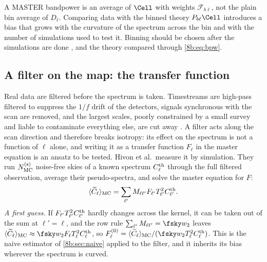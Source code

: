 \begin{pitfall}
A MASTER bandpower is an average of $\Cell$ with weights $\mathcal F_{b\ell}$, not the plain bin average of
$D_\ell$. Comparing data with the binned theory $P_{b\ell}\Cell$ introduces a bias that grows with the
curvature of the spectrum across the bin and with the number of simulations used to test it.
Binning should be chosen after the simulations are done , and the theory compared
through \eqref{8b:eq:bpw}.
\end{pitfall}

\subsection{A filter on the map: the transfer function}
\label{8b:sec:transfer}

Real data are filtered before the spectrum is taken. Timestreams are high-pass filtered to
suppress the $1/f$ drift of the detectors, signals synchronous with the scan are removed, and the
largest scales, poorly constrained by a small survey and liable to contaminate everything else, are
cut away . A filter acts along the scan direction and therefore breaks isotropy:
its effect on the spectrum is not a function of $\ell$ alone, and writing it as a transfer function
$F_\ell$ in the master equation is an ansatz to be tested. Hivon et al.\ measure it by simulation.
They run $N^{(\rm s)}_{\rm MC}$ noise-free skies of a known spectrum $C^{\rm th}_\ell$ through the full
filtered observation, average their pseudo-spectra, and solve the master equation for $F$:
\[
  \langle\widetilde C_\ell\rangle_{\rm MC}=\sum_{\ell'}M_{\ell\ell'}F_{\ell'}T^2_{\ell'}C^{\rm th}_{\ell'} .
\]
\emph{A first guess.} If $F_{\ell'}T^2_{\ell'}C^{\rm th}_{\ell'}$ hardly changes across the kernel, it can be taken out of
the sum at $\ell'=\ell$, and the row rule $\sum_{\ell'}M_{\ell\ell'}=\fsky w_2$ leaves
$\langle\widetilde C_\ell\rangle_{\rm MC}\approx\fsky w_2F_\ell T^2_\ell C^{\rm th}_\ell$, so
$F^{(0)}_\ell=\langle\widetilde C_\ell\rangle_{\rm MC}/(\fsky w_2T^2_\ell C^{\rm th}_\ell)$. This is the naive estimator of
\cref{8b:sec:naive} applied to the filter, and it inherits its bias wherever the spectrum is curved.

